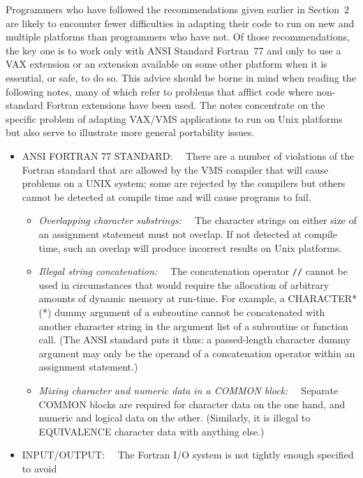 \documentclass[twoside,11pt,nolof,noabs]{starlink}
\renewcommand{\_}{{\tt\char'137}}
\begin{document}
Programmers who have followed the recommendations given earlier in
Section~2 are likely to encounter fewer difficulties in adapting their
code to run on new and multiple platforms than programmers who have
not.  Of those recommendations, the key one is to work only with
ANSI Standard Fortran~77 and only to use a VAX extension
or an extension available on some other platform when it is essential,
or safe, to do so.  This advice
should be borne in mind when reading the following
notes, many of which refer to problems that
afflict code where non-standard Fortran extensions have
been used.  The notes concentrate on the specific problem of adapting
VAX/VMS applications to run on Unix platforms but also serve to
illustrate more general portability issues.
\begin{itemize}
 \item ANSI FORTRAN 77 STANDARD:~~
  There are a number of violations of the Fortran standard that are
  allowed by the VMS compiler that will cause problems on a UNIX system;
  some are rejected by the compilers but others cannot be detected at
  compile time and will cause programs to fail.
  \begin{itemize}
   \item \textit{Overlapping character substrings:~~}
    The character strings on either size of an assignment
    statement must not overlap.  If not detected at compile
    time, such an overlap will produce incorrect results on
    Unix platforms.
   \item \textit{Illegal string concatenation:~~}
    The concatenation operator \verb|//| cannot be used in
    circumstances that would require the allocation of arbitrary
    amounts of dynamic memory at run-time.
    For example, a CHARACTER*(*)
    dummy argument of a subroutine cannot be concatenated
    with another character string in the argument list of a subroutine or
    function call.  (The ANSI standard puts it thus:  a passed-length
    character dummy argument may only be the operand of a concatenation
    operator within an assignment statement.)
   \item \textit{Mixing character and numeric data in a COMMON block:~~}
    Separate COMMON blocks are required for character data on the one
    hand, and numeric and logical data on the other.  (Similarly,
    it is illegal to EQUIVALENCE character data with anything else.)
  \end{itemize}
 \item INPUT/OUTPUT:~~
  The Fortran I/O system is not tightly enough specified to avoid

\end{itemize}
\end{document}
